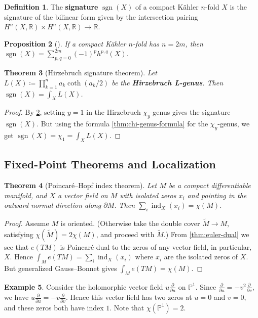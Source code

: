 \documentclass{report}
\theoremstyle{plain}
\newtheorem{theorem}{Theorem}[section]
\newtheorem{proposition}[theorem]{Proposition}
\theoremstyle{definition}
\newtheorem{definition}[theorem]{Definition}
\newtheorem{example}[theorem]{Example}
\theoremstyle{remark}
\newcommand{\di}{\partial}
\newcommand{\bP}{\mathbb{P}}
\newcommand{\bR}{\mathbb{R}}
\DeclareMathOperator{\ind}{ind}
\DeclareMathOperator{\sgn}{sgn}
\newcommand{\pder}[2]{\frac{\partial #1}{\partial #2}}
\begin{document}
\begin{definition}
  The {\bf signature} $\sgn(X)$ of a compact K\"ahler $n$-fold $X$ is
  the signature of the bilinear form given by the intersection pairing
  $H^n(X, \bR) \times H^n(X, \bR) \to \bR$.
\end{definition}

\begin{proposition}[{\cite[Corollary 3.3.18]{Huybrechts2005}}] \label{thm:signature-chi}
  If a compact K\"ahler $n$-fold has $n = 2m$, then $\sgn(X) =
  \sum_{p,q=0}^{2m} (-1)^p h^{p,q}(X)$.
\end{proposition}

\begin{theorem}[Hirzebruch signature theorem]
  Let $L(X) \coloneqq \prod_{k=1}^n a_k \coth(a_k/2)$ be the {\bf
    Hirzebruch L-genus}. Then $\sgn(X) = \int_X L(X)$.
\end{theorem}

\begin{proof}
  By \ref{thm:signature-chi}, setting $y = 1$ in the Hirzebruch
  $\chi_y$-genus gives the signature $\sgn(X)$. But using the formula
  \ref{thm:chi-genus-formula} for the $\chi_y$-genus, we get $\sgn(X)
  = \chi_1 = \int_X L(X)$.
\end{proof}

\subsection{Fixed-Point Theorems and Localization}

\begin{theorem}[Poincar\'e--Hopf index theorem]
  Let $M$ be a compact differentiable manifold, and $X$ a vector field
  on $M$ with isolated zeros $x_i$ and pointing in the outward normal
  direction along $\di M$. Then $\sum_i \ind_X(x_i) = \chi(M)$.
\end{theorem}

\begin{proof}
  Assume $M$ is oriented. (Otherwise take the double cover $\tilde{M}
  \to M$, satisfying $\chi(\tilde{M}) = 2\chi(M)$, and proceed with
  $\tilde{M}$.) From \ref{thm:euler-dual} we see that $e(TM)$ is
  Poincar\'e dual to the zeros of any vector field, in particular,
  $X$. Hence $\int_M e(TM) = \sum_i \ind_X(x_i)$ where $x_i$ are the
  isolated zeros of $X$. But generalized Gauss--Bonnet gives $\int_M
  e(TM) = \chi(M)$.
\end{proof}

\begin{example}
  Consider the holomorphic vector field $u \pder{}{u}$ on $\bP^1$.
  Since $\pder{}{u} = -v^2 \pder{}{v}$, we have $u \pder{}{u} = -v
  \pder{}{v}$. Hence this vector field has two zeros at $u = 0$ and $v
  = 0$, and these zeros both have index $1$. Note that $\chi(\bP^1) =
  2$.
\end{example}
\end{document}
